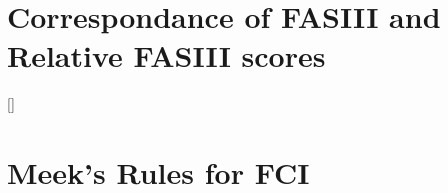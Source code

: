 \documentclass[main.tex]{subfiles}
\begin{document}
\section{Correspondance of FASIII and Relative FASIII scores}
\label{appendix:FASIII_RelFAS}
\ref{}





\section{Meek's Rules for FCI}
\label{appendix:Meek_FCI}
\end{document}
